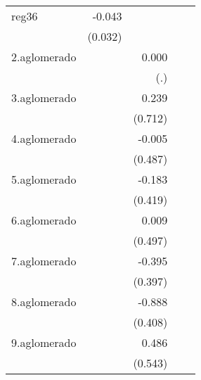 {\begin{longtable}{l*{4}{D{.}{.}{-1}}}
\addlinespace
reg36       &      -0.043         &                     &                     &                     \\
            &     (0.032)         &                     &                     &                     \\
\addlinespace
2.aglomerado&                     &       0.000         &                     &                     \\
            &                     &         (.)         &                     &                     \\
\addlinespace
3.aglomerado&                     &       0.239         &                     &                     \\
            &                     &     (0.712)         &                     &                     \\
\addlinespace
4.aglomerado&                     &      -0.005         &                     &                     \\
            &                     &     (0.487)         &                     &                     \\
\addlinespace
5.aglomerado&                     &      -0.183         &                     &                     \\
            &                     &     (0.419)         &                     &                     \\
\addlinespace
6.aglomerado&                     &       0.009         &                     &                     \\
            &                     &     (0.497)         &                     &                     \\
\addlinespace
7.aglomerado&                     &      -0.395         &                     &                     \\
            &                     &     (0.397)         &                     &                     \\
\addlinespace
8.aglomerado&                     &      -0.888\sym{*}  &                     &                     \\
            &                     &     (0.408)         &                     &                     \\
\addlinespace
9.aglomerado&                     &       0.486         &                     &                     \\
            &                     &     (0.543)         &                     &                     \\

\end{longtable}}
